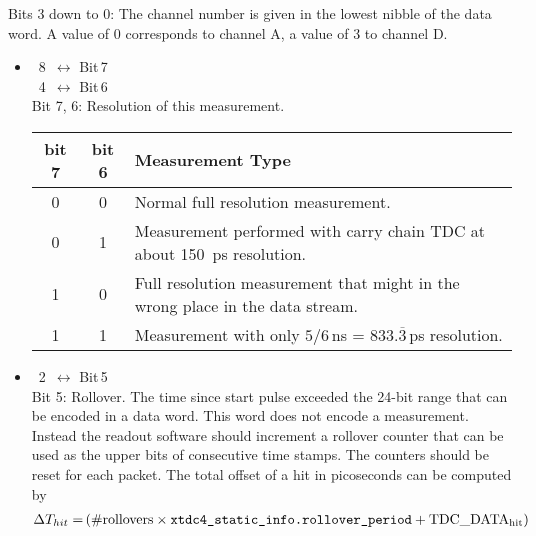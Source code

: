 \begin{description}[style=nextline]
{\begin{itemize}
        \end{itemize}

        Bits 3 down to 0:
        The channel number is given in the lowest nibble of the data word. A
        value of {0} corresponds to channel A, a value of {3}
        to channel D.\\
    }{
        \begin{itemize}
            \item{}~8~$\leftrightarrow$ Bit\,7\\
            ~4~$\leftrightarrow$ Bit\,6\\
            Bit 7, 6: Resolution of this measurement.\par
            \begin{small}
            \begin{tabular}{|c|c||l|}
                \hline
                bit 7 & bit 6 & Measurement Type \\\hline\hline
                0 & 0 &  Normal full resolution measurement.\\\hline
                0 & 1 &  Measurement performed with carry chain TDC at about \SI{150}{\pico\second} resolution.\\\hline
                1 & 0 &  Full resolution measurement that might in the wrong place in the data stream.\\\hline
                1 & 1 &  Measurement with only $5/6$\,ns = $833.\overline{3}$\,ps resolution. \\\hline
            \end{tabular}
            \end{small}
            \item{}~2~$\leftrightarrow$ Bit\,5\\
            Bit 5: Rollover. The time since start pulse exceeded the 24-bit range
            that can be encoded in a data word. This word does not encode a
            measurement.  Instead the readout software should increment a rollover
            counter that can be used as the upper bits of consecutive time stamps.
            The counters should be reset for each packet.  The total offset of a
            hit in picoseconds can be computed by
            \begin{align*}
                \Delta T_{hit} = &\,(\text{\#rollovers} \times \texttt{xtdc4\_static\_info.rollover\tu period} + \mathrm{TDC\_DATA_{hit}}) \\

\end{align*}
\end{itemize}}
\end{description}
